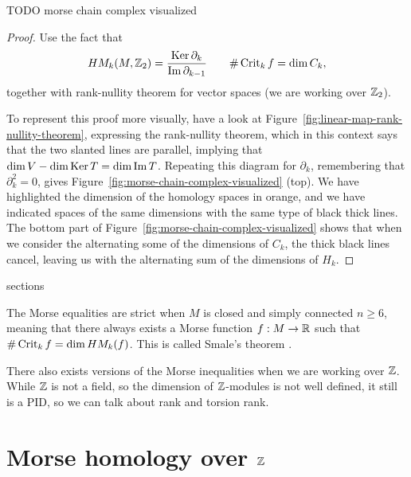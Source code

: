 \begin{marginfigure}
    \centering
    \caption{TODO morse chain complex visualized}
    \label{fig:morse-chain-complex-visualized}
\end{marginfigure}
\begin{proof}
    Use the fact that 
    \[
        \HMf[k]{M, \Z_2} = \frac{\Ker \partial_k}{\Im \partial_{k-1}} \qquad \# \Crit_k f = \dim C_k,
    \]
    together with rank-nullity theorem for vector spaces (we are working over $\Z_2$).

    To represent this proof more visually, have a look at Figure~\ref{fig:linear-map-rank-nullity-theorem}, expressing the rank-nullity theorem, which in this context says that the two slanted lines are parallel, implying that $\dim V - \dim \Ker T = \dim \Im T$.
    Repeating this diagram for $\partial_k$, remembering that  $\partial_k^2 = 0$, gives Figure~\ref{fig:morse-chain-complex-visualized} (top). We have highlighted the dimension of the homology spaces in orange, and we have indicated spaces of the same dimensions with the same type of black thick lines.
    The bottom part of Figure~\ref{fig:morse-chain-complex-visualized} shows that when we consider the alternating some of the dimensions of $C_k$, the thick black lines cancel, leaving us with the alternating sum of the dimensions of $H_k$.
\end{proof}



sections

\begin{remark}
    The Morse equalities are strict when $M$ is closed and simply connected $n\ge 6$, meaning that there always exists a Morse function $f: M \to  \R$ such that $\# \Crit_k f = \dim \HMf[k]f$. This is called Smale's theorem \cite[p.~392]{smale2007generalized}.
\end{remark}
\begin{remark}
    There also exists versions of the Morse inequalities when we are working over $\Z$. While $\Z$ is not a field,
    so the dimension of $\Z$-modules is not well defined, it still is a PID, so we can talk about rank and torsion rank.
\end{remark}


\section{Morse homology over $\Z$}

